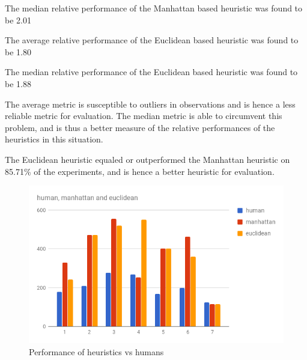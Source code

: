 The median relative performance of the Manhattan based heuristic was found to be 2.01

The average relative performance of the Euclidean based heuristic was found to be 1.80

The median relative performance of the Euclidean based heuristic was found to be 1.88
 
The average metric is susceptible to outliers in observations and is hence a less reliable metric for evaluation. The median metric is able to circumvent this problem, and is thus a better measure of the relative performances of the heuristics in this situation.
  
The Euclidean heuristic equaled or outperformed the Manhattan heuristic on 85.71\% of the experiments, and is hence a better heuristic for evaluation.


\begin{figure}
  \includegraphics[width=\linewidth]{images/chart.png}
  \caption{Performance of heuristics vs humans}
  \label{fig:chart1}
\end{figure}